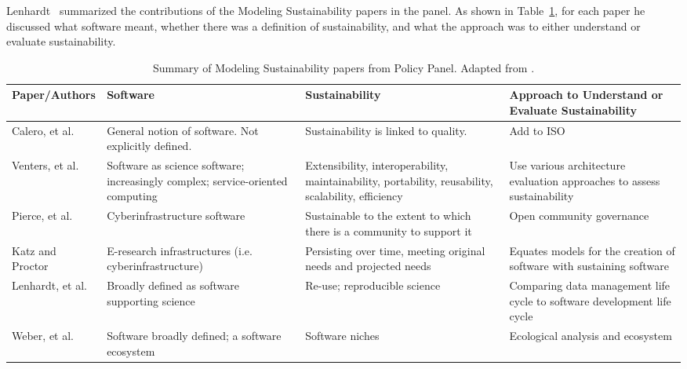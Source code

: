 \documentclass[11pt, oneside]{amsart}
\begin{document}
Lenhardt~\cite{lenhardt-wssspe1-panel} summarized the contributions of the
Modeling Sustainability papers in the panel. As shown in
Table~\ref{tab:defining-sustainability}, for each paper he discussed what
software meant, whether there was a definition of sustainability, and what the
approach was to either understand or evaluate sustainability.

\begin{table}[t]
  \begin{scriptsize}
    \begin{center}
      \caption{Summary of Modeling Sustainability papers from Policy Panel.  Adapted from \cite{lenhardt-wssspe1-panel}.}
      \label{tab:defining-sustainability}
      \begin{tabular}{|p{2.3cm}|p{3.6cm}|p{4.4cm}|p{4.8cm}|}
                \hline
{\bf Paper/Authors}
& {\bf Software}
& {\bf Sustainability}
& {\bf Approach to Understand or Evaluate Sustainability} \\
                \hline
Calero, et al. \cite{Calero_WSSSPE}
& General notion of software. Not explicitly defined.
& Sustainability is linked to quality.
& Add to ISO \\
                \hline
Venters, et al. \cite{Venters_WSSSPE}
& Software as science software; increasingly complex; service-oriented computing
& Extensibility, interoperability, maintainability, portability, reusability, scalability, efficiency
& Use various architecture evaluation approaches to assess sustainability \\
                \hline
Pierce, et al. \cite{Pierce_WSSSPE}
& Cyberinfrastructure software
& Sustainable to the extent to which there is a community to support it
& Open community governance \\
                \hline
Katz and Proctor \cite{Katz_WSSSPE}
& E-research infrastructures (i.e. cyberinfrastructure)
& Persisting over time, meeting original needs and projected needs
& Equates models for the creation of software with sustaining software \\
                \hline
Lenhardt, et al. \cite{Lenhardt_WSSSPE}
& Broadly defined as software supporting science
& Re-use; reproducible science
& Comparing data management life cycle to software development life cycle \\
                \hline
Weber, et al. \cite{Weber_WSSSPE}
& Software broadly defined; a software ecosystem
& Software niches
& Ecological analysis and ecosystem \\
                \hline
     \end{tabular}
    \end{center}
  \end{scriptsize}
\end{table}
\end{document}
